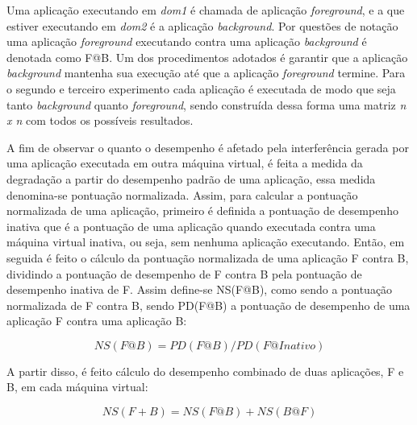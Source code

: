 Uma aplicação executando em \textit{dom1} é chamada de aplicação
\textit{foreground}, e a que estiver executando em \textit{dom2} é a aplicação
\textit{background}. Por questões de notação uma aplicação \textit{foreground}
executando contra uma aplicação \textit{background} é denotada como F@B. Um dos
procedimentos adotados é garantir que a aplicação \textit{background} mantenha
sua execução até que a aplicação \textit{foreground} termine. Para o segundo e
terceiro experimento cada aplicação é executada de modo que seja tanto
\textit{background} quanto \textit{foreground}, sendo construída dessa forma
uma matriz \textit{n x n} com todos os possíveis resultados.

A fim de observar o quanto o desempenho é afetado pela interferência gerada por
uma aplicação executada em outra máquina virtual, é feita a medida da
degradação a partir do desempenho padrão de uma aplicação, essa medida
denomina-se pontuação normalizada. Assim, para calcular a pontuação normalizada
de uma aplicação, primeiro é definida a pontuação de desempenho inativa que é a
pontuação de uma aplicação quando executada contra uma máquina virtual inativa,
ou seja, sem nenhuma aplicação executando. Então, em seguida é feito o cálculo
da pontuação normalizada de uma aplicação F contra B, dividindo a pontuação de
desempenho de F contra B pela pontuação de desempenho inativa de F. Assim
define-se NS(F@B), como sendo a pontuação normalizada de F contra B, sendo
PD(F@B) a pontuação de desempenho de uma aplicação F contra uma aplicação B:

\begin{equation}
\label{eq:degradation}
NS(F@B) = PD(F@B)/PD(F@Inativo)
\end{equation}

A partir disso, é feito cálculo do desempenho combinado de duas aplicações, F e
B, em cada máquina virtual:

\begin{equation}
\label{eq:combined}
NS ( F + B ) = NS ( F @ B ) + NS ( B @ F )
\end{equation}


